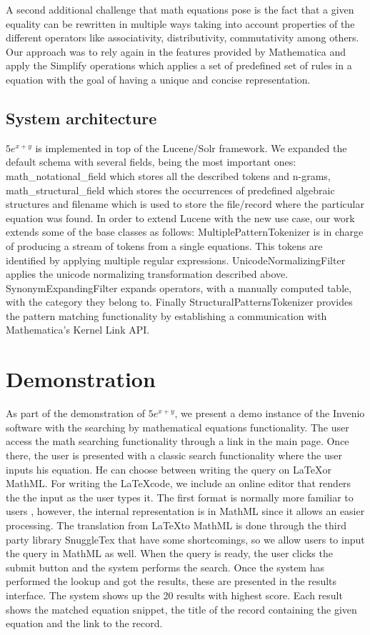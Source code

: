 \documentclass{sig-alternate}
\begin{document}
A second additional challenge that math equations pose is the fact that a given equality can be rewritten in multiple ways taking into account properties of the different operators like associativity, distributivity, commutativity among others. Our approach was to rely again in the features provided by Mathematica and apply the {\codefont Simplify} operations which applies a set of predefined set of rules in a equation with the goal of having a unique and concise representation.

\subsection{System architecture}
$5e^{x+y}$ is implemented in top of the Lucene/Solr framework. We expanded the default schema with  several fields, being the most important ones: {\codefont math\_notational\_field} which stores all the described tokens and n-grams, \\ {\codefont math\_structural\_field} which stores the occurrences of predefined algebraic structures and {\codefont filename} which is used to store the file/record where the particular equation was found. 
In order to extend Lucene with the new use case, our work extends some of the base classes as follows: {\codefont MultiplePatternTokenizer} is in charge of producing a stream of tokens from a single equations. This tokens are identified by applying multiple regular expressions. {\codefont UnicodeNormalizingFilter} applies the unicode normalizing transformation described above. {\codefont SynonymExpandingFilter} expands operators, with a manually computed table, with the category they belong to. Finally {\codefont StructuralPatternsTokenizer} provides the pattern matching functionality by establishing  a communication with Mathematica's {\codefont Kernel Link} API.


\section{Demonstration}
As part of the demonstration of $5e^{x+y}$, we present a demo instance of the Invenio software with the searching by mathematical equations functionality.
The user access the math searching functionality through a link in the main page. Once there, the user is presented with a classic search functionality where the user inputs his equation. He can choose between writing the query on \LaTeX or MathML. For writing the \LaTeX code, we include an online editor\cite{latex_editor} that renders the the input as the user types it. The first format is normally more familiar to users , however, the internal representation is in MathML since it allows an easier processing. The translation from \LaTeX  to MathML is done through the third party library SnuggleTex\cite{snuggletex} that have some shortcomings, so we allow users to input the query in MathML as well. When the query is ready, the user clicks the submit button and the system performs the search.  Once the system has performed the lookup and got the results, these are presented in the results interface. 
The system shows up the 20 results with highest score. Each result shows the matched equation snippet, the title of the record containing the given equation and the link to the record.
\end{document}
